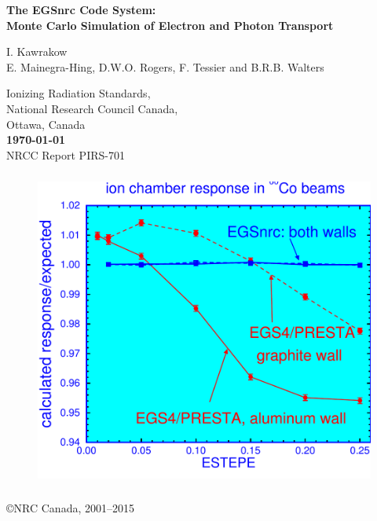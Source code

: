\documentclass[12pt,twoside]{article}  %
\newcommand{\cen}[1]{\begin{center} #1 \end{center} }
\begin{document}
\begin{center} 
{\sffamily \bfseries {\Huge The EGSnrc Code System:}\\
{\Large Monte Carlo Simulation of Electron and Photon Transport
\vspace{5mm}\\}}
\begin{large}
I. Kawrakow\\
E. Mainegra-Hing, D.W.O. Rogers, F. Tessier and B.R.B. Walters\\
\end{large}
Ionizing Radiation Standards,\\
National Research Council Canada,\\
Ottawa, Canada\\

\vspace{10mm}
{\bfseries
\today}
\vspace{5mm}\\
\hfill NRCC Report {\sf PIRS-701} \vspace*{15mm}\\


\begin{figure}[h]
\begin{center}
\leavevmode
\includegraphics[height=10.5cm]{figures/ion_chamber}
\end{center}
\end{figure}
\vfill

\copyright NRC Canada, 2001--2015
\end{center}
\newpage   %
\mbox{}
\end{document}
